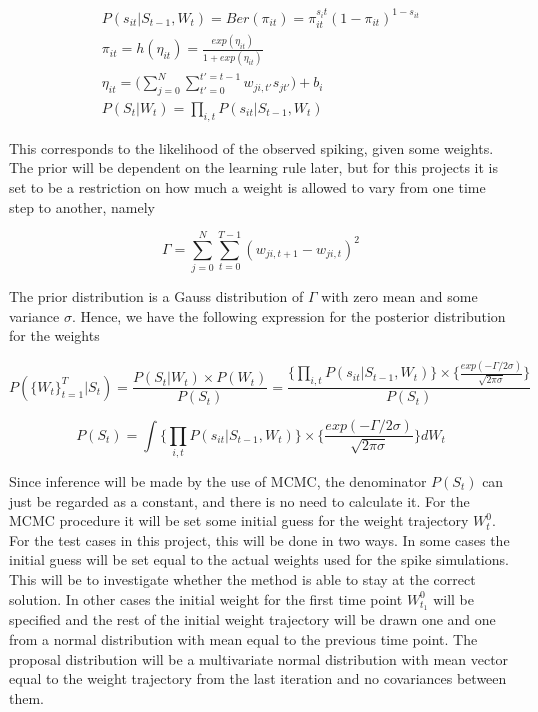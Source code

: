 \begin{equation}
\begin{split}
    P(s_{it}|S_{t-1}, W_t) =  Ber(\pi_{it}) = \pi_{it}^{s_it}(1-\pi_{it})^{1-s_{it}} \\ \pi_{it} = h(\eta_{it})= \frac{exp(\eta_{it})}{1+exp(\eta_{it})}\\
    \eta_{it} = \Big (\sum_{j=0}^{N}\sum_{t'=0}^{t'=t-1} w_{ji,t'}s_{jt'} \Big) + b_i \\
    P(S_t|W_t) = \prod_{i,t} P(s_{it}|S_{t-1}, W_t)
\end{split}
\end{equation}

This corresponds to the likelihood of the observed spiking, given some weights. The prior will be dependent on the learning rule later, but for this projects it is set to be a restriction on how much a weight is allowed to vary from one time step to another, namely

\begin{equation}
    \Gamma = \sum_{j=0}^{N} \sum_{t=0}^{T-1} (w_{ji,t+1}-w_{ji,t})^2
\end{equation}

The prior distribution is a Gauss distribution of $\Gamma$ with zero mean and some variance $\sigma$. Hence, we have the following expression for the posterior distribution for the weights

\begin{equation}
        P(\{W_t\}_{t=1}^{T}|S_t) = \frac{P(S_t|W_t)\times P(W_t)}{P(S_t)} = \frac{\Big\{\prod_{i,t} P(s_{it}|S_{t-1}, W_t)\Big\} \times \Big\{\frac{exp(-\Gamma /2\sigma)}{\sqrt{2\pi \sigma}}\Big\}}{P(S_t)} 
\end{equation}

\begin{equation}
        P(S_t) = \int \Big\{\prod_{i,t} P(s_{it}|S_{t-1}, W_t)\Big\} \times \Big\{\frac{exp(-\Gamma /2\sigma)}{\sqrt{2\pi \sigma}}\Big\} d{W_t}
\end{equation}

Since inference will be made by the use of MCMC, the denominator $P(S_t)$ can just be regarded as a constant, and there is no need to calculate it. For the MCMC procedure it will be set some initial guess for the weight trajectory $W_t^0$. For the test cases in this project, this will be done in two ways. In some cases the initial guess will be set equal to the actual weights used for the spike simulations. This will be to investigate whether the method is able to stay at the correct solution. In other cases the initial weight for the first time point $W_{t_1}^0$ will be specified and the rest of the initial weight trajectory will be drawn one and one from a normal distribution with mean equal to the previous time point. The proposal distribution will be a  multivariate normal distribution with mean vector equal to the weight trajectory from the last iteration and no covariances between them. 











\cleardoublepage